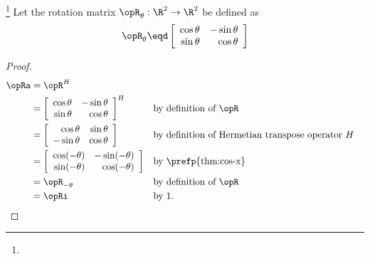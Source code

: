 \begin{example}
\footnote{
  }
\label{ex:operator_rotation_unitary}
Let the rotation matrix $\opR_\theta:\R^2\to\R^2$ be defined as
\[ \opR_\theta \eqd
   \left[\begin{array}{rr}
     \cos\theta & -\sin\theta   \\
     \sin\theta &  \cos\theta
   \end{array}\right]
\]
\end{example}
\begin{proof}
\begin{align*}
  \opRa
    &= \opR^H
  \\&= \left[\begin{array}{rr}
         \cos\theta & -\sin\theta   \\
         \sin\theta &  \cos\theta
       \end{array}\right]^H
    && \text{by definition of $\opR$}
  \\&= \left[\begin{array}{rr}
          \cos\theta &  \sin\theta   \\
         -\sin\theta &  \cos\theta
       \end{array}\right]
    && \text{by definition of Hermetian transpose operator $H$}
  \\&= \left[\begin{array}{rr}
          \cos(-\theta) & -\sin(-\theta)   \\
          \sin(-\theta) &  \cos(-\theta)
       \end{array}\right]
    && \text{by \prefp{thm:cos-x}}
  \\&= \opR_{-\theta}
    && \text{by definition of $\opR$}
  \\&= \opRi
    && \text{by 1.}
\end{align*}
\end{proof}


